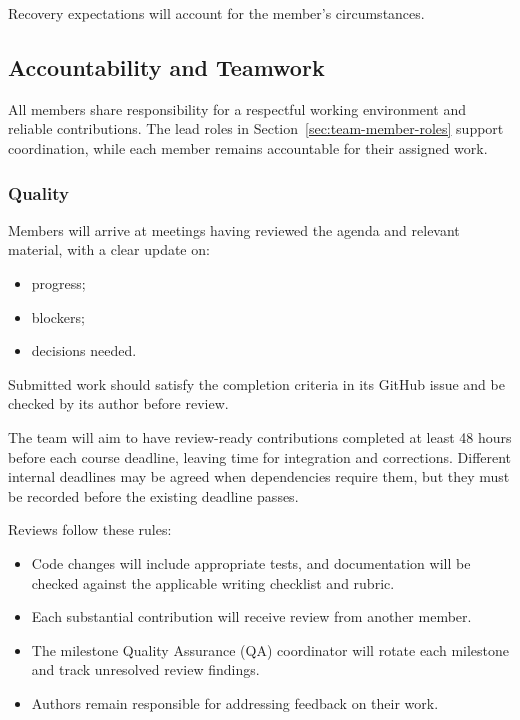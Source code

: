 \documentclass{article}
\begin{document}
Recovery expectations will account for the member's circumstances.

\subsection*{Accountability and Teamwork}

All members share responsibility for a respectful working environment
and reliable contributions. The lead roles in
Section~\ref{sec:team-member-roles} support coordination, while each
member remains accountable for their assigned work.

\subsubsection*{Quality}

Members will arrive at meetings having reviewed the agenda and
relevant material, with a clear update on:

\begin{itemize}
    \item progress;
    \item blockers;
    \item decisions needed.
\end{itemize}

Submitted work should satisfy the completion criteria in its GitHub
issue and be checked by its author before review.

The team will aim to have review-ready contributions completed at
least 48 hours before each course deadline, leaving time for
integration and corrections. Different internal deadlines may be
agreed when dependencies require them, but they must be recorded
before the existing deadline passes.

Reviews follow these rules:

\begin{itemize}
    \item Code changes will include appropriate tests, and documentation
    will be checked against the applicable writing checklist and rubric.
    \item Each substantial contribution will receive review from another
    member.
    \item The milestone Quality Assurance (QA) coordinator will rotate each
    milestone and track unresolved review findings.
    \item Authors remain responsible for addressing feedback on their work.
\end{itemize}
\end{document}
